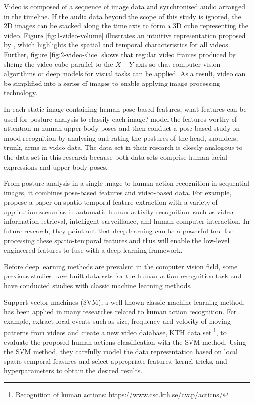 Video is composed of a sequence of image data and synchronised audio arranged in the timeline. 
If the audio data beyond the scope of this study is ignored, the 2D images can be stacked along the time axis to form a 3D cube representing the video. Figure \ref{fig:1-video-volume} illustrates an intuitive representation proposed by \citet{fels1999interactive}, which highlights the spatial and temporal characteristics for all videos.
Further, figure \ref{fig:2-video-slice} shows that regular video frames produced by slicing the video cube parallel to the $X-Y$ axis so that computer vision algorithms or deep models for visual tasks can be applied.
As a result, video can be simplified into a series of images to enable applying image processing technology.

In each static image containing human pose-based features, what features can be used for posture analysis to classify each image? 
\citet{thrasher2011mood} model the features worthy of attention in human upper body poses and then conduct a pose-based study on mood recognition by analysing and rating the postures of the head, shoulders, trunk, arms in video data.
The data set in their research is closely analogous to the data set in this research because both data sets comprise human facial expressions and upper body poses.

From posture analysis in a single image to human action recognition in sequential images, it combines pose-based features and video-based data.
For example, \citet{yao2016spatio} propose a paper on spatio-temporal feature extraction with a variety of application scenarios in automatic human activity recognition, such as video information retrieval, intelligent surveillance, and human-computer interaction.
In future research, they point out that deep learning can be a powerful tool for processing these spatio-temporal features and thus will enable the low-level engineered features to fuse with a deep learning framework.

Before deep learning methods are prevalent in the computer vision field, some previous studies have built data sets for the human action recognition task and have conducted studies with classic machine learning methods.

Support vector machines (SVM), a well-known classic machine learning method, has been applied in many researches related to human action recognition.
For example, \citet{schuldt2004recognizing} extract local events such as size, frequency and velocity of moving patterns from videos and create a new video database, KTH data set \footnote{Recognition of human actions: \url{https://www.csc.kth.se/cvap/actions/}}, to evaluate the proposed human actions classification with the SVM method.
Using the SVM method, they carefully model the data representation based on local spatio-temporal features and select appropriate features, kernel tricks, and hyperparameters to obtain the desired results.

